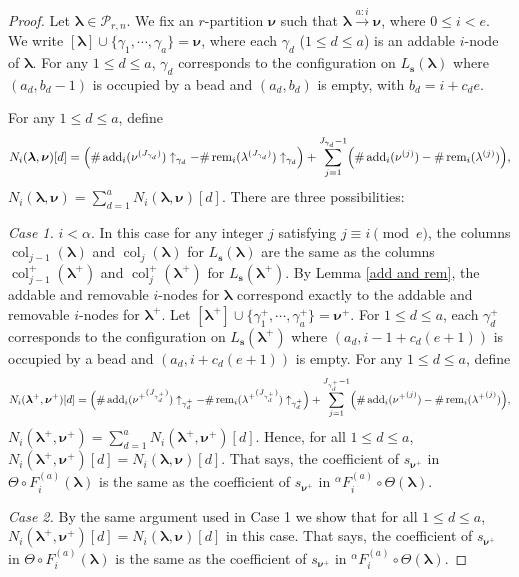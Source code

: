 \documentclass[a4paper,10pt]{amsart}
\theoremstyle{plain}
\def\bs{{\boldsymbol{s}}}
\def\blam{{\boldsymbol \lambda}}
\def\bnu{{\boldsymbol \nu}}
\DeclareMathOperator{\col}{col}
\newcommand{\add}{\operatorname{add}}
\newcommand{\rem}{\operatorname{rem}}
\theoremstyle{plain}
\numberwithin{equation}{section}
\begin{document}
\begin{proof}
Let $\blam \in \mathscr P_{r, n}$. We fix an $r$-partition $\bnu$ such that $\blam\xrightarrow{a:i} \bnu$, where $0\le i<e$. We write $[\blam] \cup \{\gamma_1, \cdots, \gamma_a\}=\bnu$, where each $\gamma_d$ ($1\le d\le a$) is an addable $i$-node of $\blam$. For any $1\le d\le a$, $\gamma_d$ corresponds to the configuration on $L_\bs(\blam)$ where $(a_d, b_d-1)$ is occupied by a bead and $(a_d, b_d)$ is empty, with $b_d=i+c_de$.

For any $1\le d\le a$, define
$$N_i(\blam, \bnu)[d]=\Bigl(\#\add_i (\nu^{(J_{\gamma_d})} )\uparrow_{\gamma_d}-\#\rem_i (\lambda^{(J_{\gamma_d})})\uparrow_{\gamma_d}\Bigr)+ \sum^{J_{\gamma_d}-1}_{j=1}\Bigl(\#\add_i (\nu^{(j)})-\#\rem_i (\lambda^{(j)})\Bigr),$$
$N_i(\blam, \bnu)=\sum_{d=1}^a N_i(\blam, \bnu)[d].$ There are three possibilities:

{\it Case 1.} $i<\alpha$. In this case for any integer $j$ satisfying $j\equiv i\pmod e$, the columns $\col_{j-1}(\blam)$ and $\col_j(\blam)$ for $L_\bs(\blam)$ are the same as the columns $\col^+_{j-1}(\blam^+)$ and $\col^+_j(\blam^+)$ for $L_\bs(\blam^+)$.
By Lemma \ref{add and rem}, the addable and removable $i$-nodes for $\blam$ correspond exactly to the addable and removable $i$-nodes for $\blam^+$.
Let $[\blam^+]\cup \{\gamma^+_1, \cdots, \gamma^+_a\}=\bnu^+$. For $1\le d\le a$, each $\gamma_d^+$ corresponds to the configuration on $L_\bs(\blam^+)$ where $(a_d, i-1+c_d(e+1))$ is occupied by a bead and $(a_d, i+c_d(e+1))$ is empty.
For any $1\le d\le a$, define
$$N_i(\blam^+, \bnu^+)[d]=\Bigl(\#\add_i ({\nu^+}^{(J_{\gamma^+_d})} )\uparrow_{\gamma^+_d}-\#\rem_i ({\lambda^+}^{(J_{\gamma^+_d})})\uparrow_{\gamma^+_d}\Bigr)+ \sum^{J_{\gamma^+_d}-1}_{j=1}\Bigl(\#\add_i ({\nu^+}^{(j)})-\#\rem_i ({\lambda^+}^{(j)})\Bigr),$$
$N_i(\blam^+, \bnu^+)=\sum_{d=1}^a N_i(\blam^+, \bnu^+)[d].$
Hence, for all $1\le d\le a$, $N_i(\blam^+, \bnu^+)[d]=N_i(\blam, \bnu)[d]$. That says, the coefficient of $s_{\bnu^+}$ in $\varTheta\circ F_i^{(a)}(\blam)$ is the same as the coefficient of $s_{\bnu^+}$ in ${^\alpha}\!F_i^{(a)}\circ \varTheta(\blam)$.



{\it Case 2.} By the same argument used in Case 1 we show that for all $1\le d\le a$, $N_i(\blam^+, \bnu^+)[d]=N_i(\blam, \bnu)[d]$ in this case. That says, the coefficient of $s_{\bnu^+}$ in $\varTheta\circ F_i^{(a)}(\blam)$ is the same as the coefficient of $s_{\bnu^+}$ in ${^\alpha}\!F_i^{(a)}\circ \varTheta(\blam)$.


\end{proof}
\end{document}

